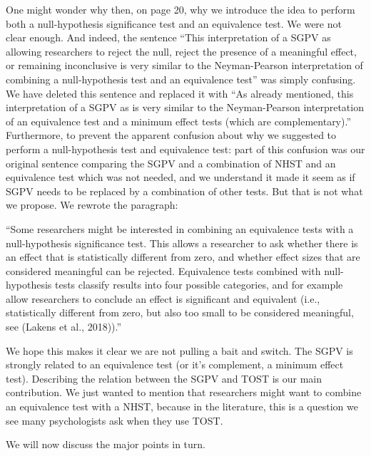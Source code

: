 \documentclass[man]{apa6}
\begin{document}
One might wonder why then, on page 20, why we introduce the idea to
perform both a null-hypothesis significance test and an equivalence
test. We were not clear enough. And indeed, the sentence \enquote{This
interpretation of a SGPV as allowing researchers to reject the null,
reject the presence of a meaningful effect, or remaining inconclusive is
very similar to the Neyman-Pearson interpretation of combining a
null-hypothesis test and an equivalence test} was simply confusing. We
have deleted this sentence and replaced it with \enquote{As already
mentioned, this interpretation of a SGPV as is very similar to the
Neyman-Pearson interpretation of an equivalence test and a minimum
effect tests (which are complementary).} Furthermore, to prevent the
apparent confusion about why we suggested to perform a null-hypothesis
test and equivalence test: part of this confusion was our original
sentence comparing the SGPV and a combination of NHST and an equivalence
test which was not needed, and we understand it made it seem as if SGPV
needs to be replaced by a combination of other tests. But that is not
what we propose. We rewrote the paragraph:

\enquote{Some researchers might be interested in combining an
equivalence tests with a null-hypothesis significance test. This allows
a researcher to ask whether there is an effect that is statistically
different from zero, and whether effect sizes that are considered
meaningful can be rejected. Equivalence tests combined with
null-hypothesis tests classify results into four possible categories,
and for example allow researchers to conclude an effect is significant
and equivalent (i.e., statistically different from zero, but also too
small to be considered meaningful, see (Lakens et al., 2018)).}

We hope this makes it clear we are not pulling a bait and switch. The
SGPV is strongly related to an equivalence test (or it's complement, a
minimum effect test). Describing the relation between the SGPV and TOST
is our main contribution. We just wanted to mention that researchers
might want to combine an equivalence test with a NHST, because in the
literature, this is a question we see many psychologists ask when they
use TOST.

We will now discuss the major points in turn.
\end{document}
